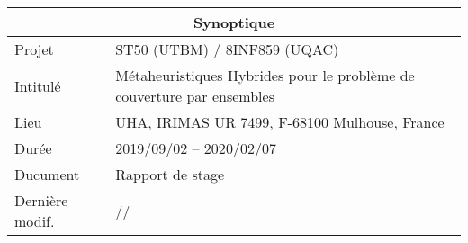 
\begin{tabularx}{0.9\textwidth}{|l|X|}
	\hline
	\multicolumn{2}{|c|}{\cellcolor{gray!30}Synoptique}\\
	\hline
	Projet & \acrshort{ST50} (\acrshort{UTBM}) / \acrshort{8INF859} (\acrshort{UQAC})\\
	Intitulé & Métaheuristiques Hybrides pour le problème de couverture par ensembles\\
	Lieu & \acrshort{UHA}, \acrshort{IRIMAS} UR 7499, F-68100 Mulhouse, France\\
	Durée & 2019/09/02 -- 2020/02/07\\
	\hline
	Ducument & Rapport de stage\\
	Dernière modif. & \the\year/\twodigits\month/\twodigits\day\\
	\hline
\end{tabularx}
